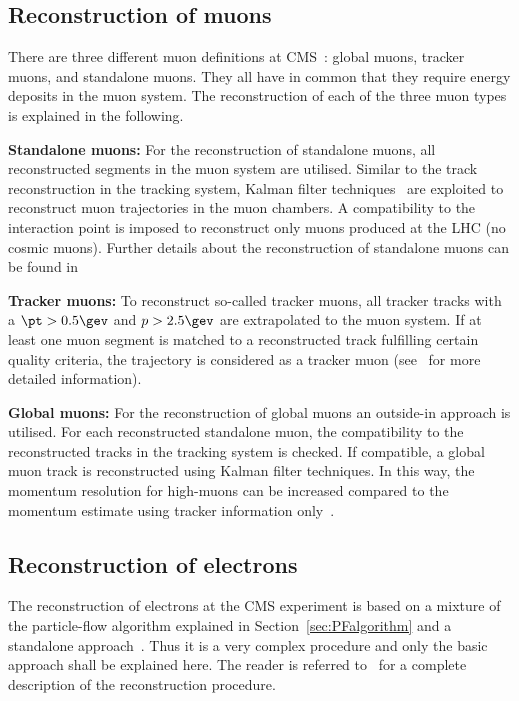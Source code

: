 \subsection{Reconstruction of muons}
\label{subsec:MuonReconstruction}
There are three different muon definitions at CMS~\cite{bib:CMS:muon_recoEff}: global muons, tracker muons, and standalone muons.
They all have in common that they require energy deposits in the muon system.
The reconstruction of each of the three muon types is explained in the following.
\begin{description}
\item \textbf{Standalone muons:} For the reconstruction of standalone muons, all reconstructed segments in the muon system are utilised. 
                                 Similar to the track reconstruction in the tracking system, Kalman filter techniques~\cite{bib:KalmanFilter_1987} are exploited to reconstruct muon trajectories in the muon chambers.
                                 A compatibility to the interaction point is imposed to reconstruct only muons produced at the LHC (no cosmic muons).
                                 Further details about the reconstruction of standalone muons can be found in~\cite{bib:StandaloneMuonReconstruction,bib:CMS:TDR_2006} 
\item \textbf{Tracker muons:} To reconstruct so-called tracker muons, all tracker tracks with a \mbox{$\pt>0.5\gev$} and $p>2.5\gev$ are extrapolated to the muon system. 
                              If at least one muon segment is matched to a reconstructed track fulfilling certain quality criteria, the trajectory is considered as a tracker muon (see~\cite{bib:CMS:muon_recoEff} for more detailed information).
\item \textbf{Global muons:} For the reconstruction of global muons an outside-in approach is utilised. 
                             For each reconstructed standalone muon, the compatibility to the reconstructed tracks in the tracking system is checked. 
                             If compatible, a global muon track is reconstructed using Kalman filter techniques. 
                             In this way, the momentum resolution for high-\pt muons can be increased compared to the momentum estimate using tracker information only~\cite{bib:CMS:muon_recoEff}.
\end{description}

\subsection{Reconstruction of electrons}
\label{subsec:ElectronReconstruction}
The reconstruction of electrons at the CMS experiment is based on a mixture of the particle-flow algorithm explained in Section~\ref{sec:PFalgorithm} and a standalone approach~\cite{bib:StandaloneElectronReconstruction}.
Thus it is a very complex procedure and only the basic approach shall be explained here.
The reader is referred to~\cite{bib:CMS:elec_recoEff} for a complete description of the reconstruction procedure.


